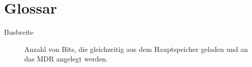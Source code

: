\chapter{Glossar}
\label{chapter:Anhang-Glossar}

\begin{description}
    \item[Busbreite] Anzahl von Bits, die gleichzeitig aus dem Hauptspeicher geladen und an das MDR angelegt werden.
\end{description}
